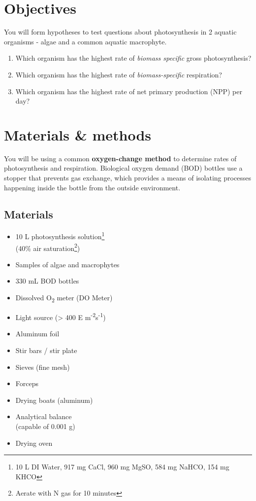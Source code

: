 \documentclass[]{book}
\theoremstyle{definition}
\theoremstyle{definition}
\theoremstyle{definition}
\theoremstyle{remark}
\begin{document}
\section{Objectives}\label{objectives-1}

You will form hypotheses to test questions about photosynthesis in 2
aquatic organisms - algae and a common aquatic macrophyte.

\begin{enumerate}
\def\labelenumi{\arabic{enumi}.}
\item
  Which organism has the highest rate of \emph{biomass specific} gross
  photosynthesis?
\item
  Which organism has the highest rate of \emph{biomass-specific}
  respiration?
\item
  Which organism has the highest rate of net primary production (NPP)
  per day?
\end{enumerate}

\section{Materials \& methods}\label{materials-methods}

You will be using a common \textbf{oxygen-change method} to determine
rates of photosynthesis and respiration. Biological oxygen demand (BOD)
bottles use a stopper that prevents gas exchange, which provides a means
of isolating processes happening inside the bottle from the outside
environment.

\pagebreak

\subsection{Materials}\label{materials}

\begin{multicols}{2}
\begin{itemize}{}
  \item 10 L photosynthesis solution\footnote{10 L DI Water, 917 mg CaCl, 960 mg MgSO, 584 mg NaHCO, 154 mg KHCO}\\(40\% air saturation\footnote{Aerate with N gas for 10 minutes})
  \item Samples of algae and macrophytes
  \item 330 mL BOD bottles
  \item Dissolved O\textsubscript{2} meter (DO Meter)
  \item Light source (> 400 \textmu E m\textsuperscript{-2}s\textsuperscript{-1})
  \item Aluminum foil
  \item Stir bars / stir plate
  \item Sieves (fine mesh)
  \item Forceps
  \item Drying boats (aluminum)
  \item Analytical balance \\(capable of 0.001 g)
  \item Drying oven
\end{itemize}
\end{multicols}
\end{document}
